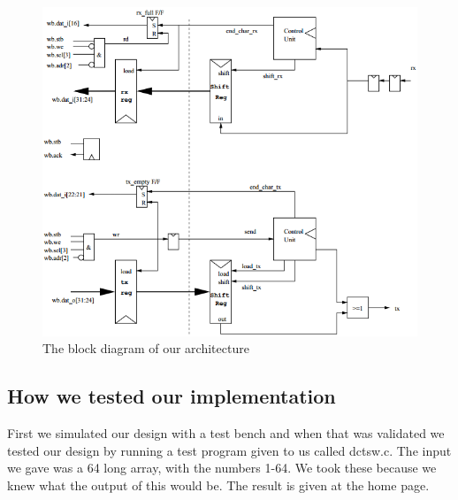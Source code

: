 \documentclass[a4paper]{article}
\begin{document}
\begin{figure}[h]
\centering
\includegraphics[scale=0.5]{blockdiagram.png}
\caption{The block diagram of our architecture}
\label{fig:block diagram}
\end{figure}

\subsection{How we tested our implementation}

First we simulated our design with a test bench and when that was validated we tested our design by running a test program given to us called dctsw.c. The input we gave was a 64 long array, with the numbers 1-64. We took these because we knew what the output of this would be. The result is given at the home page.
\end{document}
